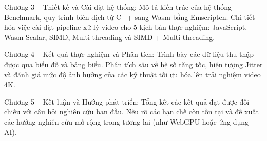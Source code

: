 Chương 3 – Thiết kế và Cài đặt hệ thống: Mô tả kiến trúc của hệ thống Benchmark, quy trình biên dịch từ C++ sang Wasm bằng Emscripten. Chi tiết hóa việc cài đặt pipeline xử lý video cho 5 kịch bản thực nghiệm: JavaScript, Wasm Scalar, SIMD, Multi-threading và SIMD + Multi-threading.


Chương 4 – Kết quả thực nghiệm và Phân tích: Trình bày các dữ liệu thu thập được qua biểu đồ và bảng biểu. Phân tích sâu về hệ số tăng tốc, hiện tượng Jitter và đánh giá mức độ ảnh hưởng của các kỹ thuật tối ưu hóa lên trải nghiệm video 4K.


Chương 5 – Kết luận và Hướng phát triển: Tổng kết các kết quả đạt được đối chiếu với câu hỏi nghiên cứu ban đầu. Nêu rõ các hạn chế còn tồn tại và đề xuất các hướng nghiên cứu mở rộng trong tương lai (như WebGPU hoặc ứng dụng AI).
